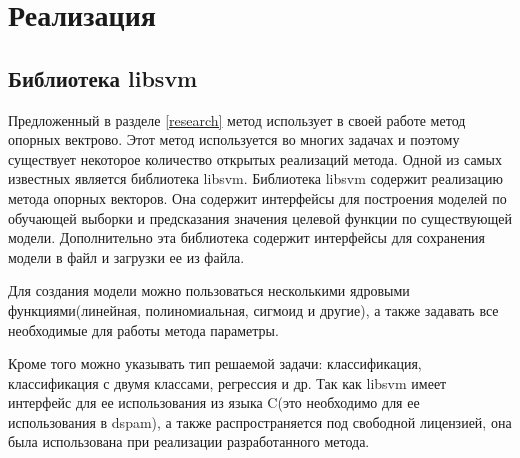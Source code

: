 \newpage
\section{Реализация}

\subsection{Библиотека libsvm}
Предложенный в разделе \ref{research} метод использует в своей работе метод опорных вектрово. Этот метод используется во многих задачах и поэтому существует некоторое количество открытых реализаций метода. Одной из самых известных является библиотека libsvm\cite{LIBSVM}.
Библиотека libsvm содержит реализацию метода опорных векторов. Она содержит интерфейсы для построения моделей по обучающей выборки и предсказания значения целевой функции по  существующей модели. Дополнительно эта библиотека содержит интерфейсы для сохранения модели в файл и загрузки ее из файла.

Для создания модели можно пользоваться несколькими ядровыми функциями(линейная, полиномиальная, сигмоид и другие), а также задавать все необходимые для работы метода параметры.

Кроме того можно указывать тип решаемой задачи: классификация, классификация с двумя классами, регрессия и др.
Так как libsvm имеет интерфейс для ее использования из языка C(это необходимо для ее использования в dspam), а также распространяется под свободной лицензией, она была использована при реализации разработанного метода.



